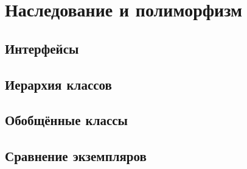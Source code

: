 \section{Наследование и полиморфизм}

\subsection{Интерфейсы}

\subsection{Иерархия классов}

\subsection{Обобщённые классы}

\subsection{Сравнение экземпляров}
